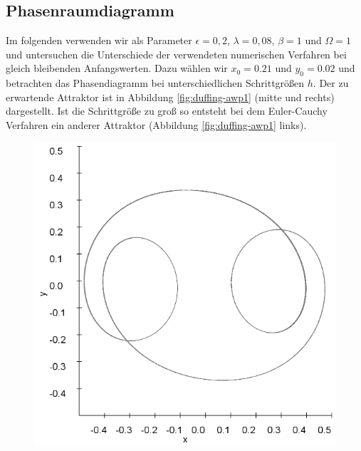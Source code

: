 \documentclass{scrartcl}
\begin{document}
\subsection { Phasenraumdiagramm }
Im folgenden verwenden wir als Parameter $\epsilon = 0,2$, $\lambda = 0,08$, $\beta = 1$ und $\Omega = 1$ und untersuchen die Unterschiede der verwendeten numerischen Verfahren bei gleich bleibenden Anfangswerten. Dazu wählen wir $x_0=0.21$ und $y_0=0.02$ und betrachten das Phasendiagramm bei unterschiedlichen Schrittgrößen $h$. Der zu erwartende Attraktor ist in Abbildung \ref{fig:duffing-awp1} (mitte und rechts) dargestellt. Ist die Schrittgröße zu groß so entsteht bei dem Euler-Cauchy Verfahren ein anderer Attraktor (Abbildung \ref{fig:duffing-awp1} links).
\begin{figure}
\includegraphics[scale=0.28]{duffing-awp1-500k-nach-500k-h0,1-euler}

\end{figure}
\end{document}
